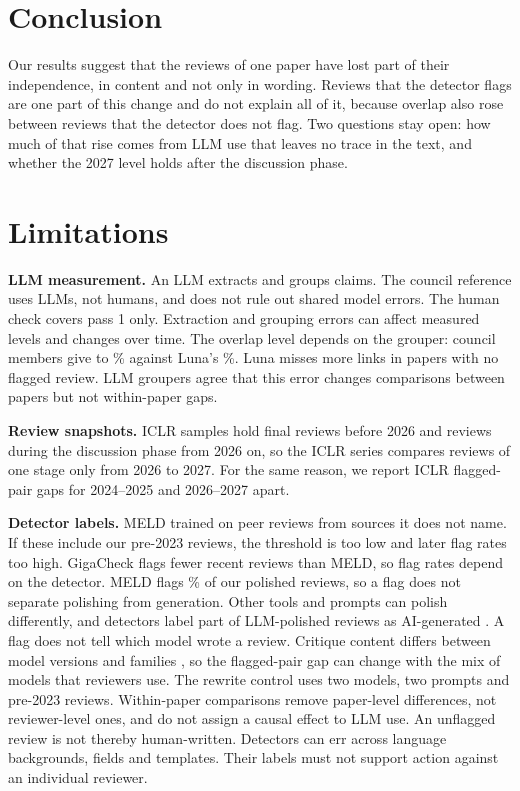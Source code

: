 \documentclass[11pt]{article}
\begin{document}
\section{Conclusion}
Our results suggest that the reviews of one paper have lost part of their independence, in content and not only in wording. Reviews that the detector flags are one part of this change and do not explain all of it, because overlap also rose between reviews that the detector does not flag. Two questions stay open: how much of that rise comes from LLM use that leaves no trace in the text, and whether the 2027 level holds after the discussion phase.

\clearpage
\section*{Limitations}
\textbf{LLM measurement.} An LLM extracts and groups claims. The council reference uses LLMs, not humans, and does not rule out shared model errors. The human check covers pass 1 only. Extraction and grouping errors can affect measured levels and changes over time. The overlap level depends on the grouper: council members give \RefPipeLevelMemberMin{} to \RefPipeLevelMemberMax\% against Luna's \RefPipeLuna\%. Luna misses more links in papers with no flagged review. LLM groupers agree that this error changes comparisons between papers but not within-paper gaps.

\textbf{Review snapshots.} ICLR samples hold final reviews before 2026 and reviews during the discussion phase from 2026 on, so the ICLR series compares reviews of one stage only from 2026 to 2027. For the same reason, we report ICLR flagged-pair gaps for 2024--2025 and 2026--2027 apart.

\textbf{Detector labels.} MELD trained on peer reviews from sources it does not name. If these include our pre-2023 reviews, the threshold is too low and later flag rates too high. GigaCheck flags fewer recent reviews than MELD, so flag rates depend on the detector. MELD flags \PolishFlagged\% of our polished reviews, so a flag does not separate polishing from generation. Other tools and prompts can polish differently, and detectors label part of LLM-polished reviews as AI-generated \citep{saha2026policies}. A flag does not tell which model wrote a review. Critique content differs between model versions and families \citep{guo2026drift}, so the flagged-pair gap can change with the mix of models that reviewers use. The rewrite control uses two models, two prompts and pre-2023 reviews. Within-paper comparisons remove paper-level differences, not reviewer-level ones, and do not assign a causal effect to LLM use. An unflagged review is not thereby human-written. Detectors can err across language backgrounds, fields and templates. Their labels must not support action against an individual reviewer.
\end{document}
